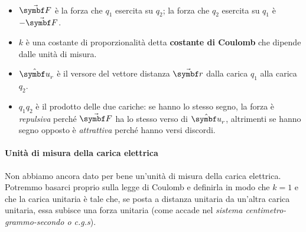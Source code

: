 \begin{observes}~
	\begin{itemize}
		\item $\vba{F}$ è la forza che $q_1$ esercita su $q_2$; la forza che $q_2$ esercita su $q_1$ è $-\vba{F}$.
		\item $k$ è una costante di proporzionalità detta \textbf{costante di Coulomb} che dipende dalle unità di misura.
		\item $\vbh{u}_r$ è il versore del vettore distanza $\vba{r}$ dalla carica $q_1$ alla carica $q_2$.
		\item $q_1q_2$ è il prodotto delle due cariche: se hanno lo stesso segno, la forza è \textit{repulsiva} perché $\vba{F}$ ha lo stesso verso di $\vbh{u}_r$, altrimenti se hanno segno opposto è \textit{attrattiva} perché hanno versi discordi.
	\end{itemize}
\end{observes}
\paragraph{Unità di misura della carica elettrica}
Non abbiamo ancora dato per bene un'unità di misura della carica elettrica. Potremmo basarci proprio sulla legge di Coulomb e definirla in modo che $k=1$ e che la carica unitaria è tale che, se posta a distanza unitaria da un'altra carica unitaria, essa subisce una forza unitaria (come accade nel \textit{sistema centimetro-grammo-secondo o c.g.s}).  

